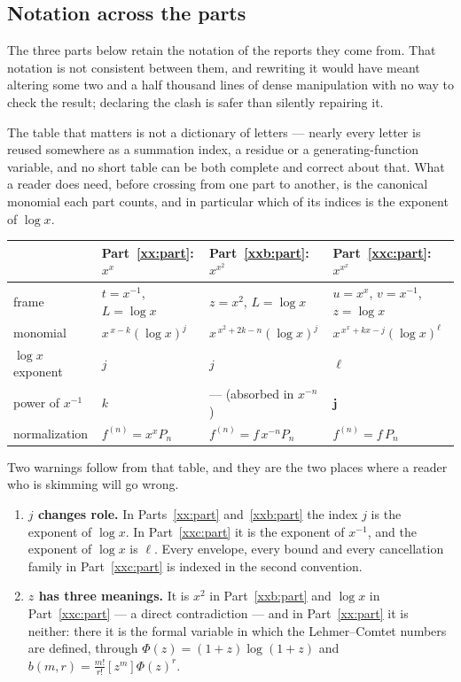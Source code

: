 \documentclass[11pt,a4paper]{article}
\numberwithin{equation}{section}
\theoremstyle{definition}
\theoremstyle{remark}
\theoremstyle{plain}
\begin{document}
\subsection{Notation across the parts}\label{fw:notation}

The three parts below retain the notation of the reports they come from.  That
notation is not consistent between them, and rewriting it would have meant
altering some two and a half thousand lines of dense manipulation with no way to
check the result; declaring the clash is safer than silently repairing it.

The table that matters is not a dictionary of letters --- nearly every letter is
reused somewhere as a summation index, a residue or a generating-function
variable, and no short table can be both complete and correct about that.  What
a reader does need, before crossing from one part to another, is the canonical
monomial each part counts, and in particular which of its indices is the
exponent of $\log x$.

\begin{center}
\begin{tabular}{@{}llll@{}}
\toprule
 & Part~\ref{xx:part}: $x^x$ & Part~\ref{xxb:part}: $x^{x^2}$ &
 Part~\ref{xxc:part}: $x^{x^x}$\\
\midrule
frame & $t=x^{-1}$, $L=\log x$ & $z=x^2$, $L=\log x$ &
 $u=x^x$, $v=x^{-1}$, $z=\log x$\\[3pt]
monomial & $x^{\,x-k}(\log x)^{j}$ & $x^{\,x^2+2k-n}(\log x)^{j}$ &
 $x^{\,x^x+kx-j}(\log x)^{\ell}$\\[3pt]
$\log x$ exponent & $j$ & $j$ & $\boldsymbol{\ell}$\\[3pt]
power of $x^{-1}$ & $k$ & --- (absorbed in $x^{-n}$) & $\boldsymbol{j}$\\[3pt]
normalization & $f^{(n)}=x^xP_n$ & $f^{(n)}=f\,x^{-n}P_n$ & $f^{(n)}=f\,P_n$\\
\bottomrule
\end{tabular}
\end{center}

\noindent
Two warnings follow from that table, and they are the two places where a reader
who is skimming will go wrong.

\begin{enumerate}[leftmargin=1.8em,itemsep=3pt]
\item \textbf{$j$ changes role.}  In Parts~\ref{xx:part} and~\ref{xxb:part} the
 index $j$ is the exponent of $\log x$.  In Part~\ref{xxc:part} it is the
 exponent of $x^{-1}$, and the exponent of $\log x$ is $\ell$.  Every envelope,
 every bound and every cancellation family in Part~\ref{xxc:part} is indexed in
 the second convention.
\item \textbf{$z$ has three meanings.}  It is $x^2$ in Part~\ref{xxb:part} and
 $\log x$ in Part~\ref{xxc:part} --- a direct contradiction --- and in
 Part~\ref{xx:part} it is neither: there it is the formal variable in which the
 Lehmer--Comtet numbers are defined, through $\Phi(z)=(1+z)\log(1+z)$ and
 $b(m,r)=\tfrac{m!}{r!}[z^m]\Phi(z)^r$.
\end{enumerate}
\end{document}
